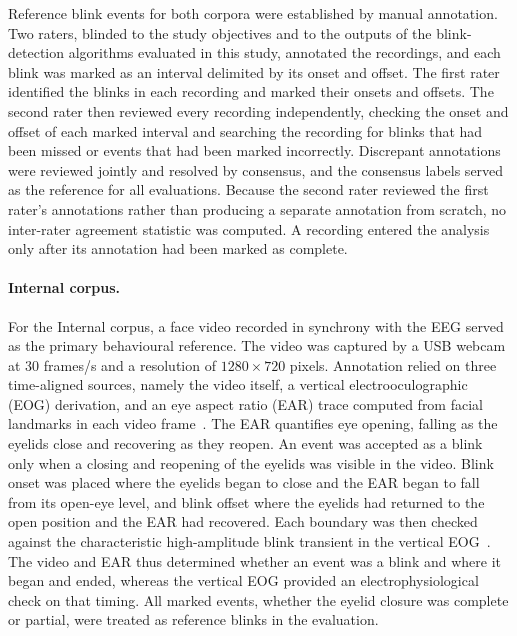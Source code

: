 \documentclass[journal,twoside,web]{ieeecolor}
\begin{document}
Reference blink events for both corpora were established by manual annotation. Two raters, blinded to the study objectives and to the outputs of the blink-detection algorithms evaluated in this study, annotated the recordings, and each blink was marked as an interval delimited by its onset and offset. The first rater identified the blinks in each recording and marked their onsets and offsets. The second rater then reviewed every recording independently, checking the onset and offset of each marked interval and searching the recording for blinks that had been missed or events that had been marked incorrectly. Discrepant annotations were reviewed jointly and resolved by consensus, and the consensus labels served as the reference for all evaluations. Because the second rater reviewed the first rater's annotations rather than producing a separate annotation from scratch, no inter-rater agreement statistic was computed. A recording entered the analysis only after its annotation had been marked as complete.

\paragraph{Internal corpus.}
For the Internal corpus, a face video recorded in synchrony with the EEG served as the primary behavioural reference. The video was captured by a USB webcam at 30 frames/s and a resolution of $1280\times720$ pixels.
%
Annotation relied on three time-aligned sources, namely the video itself, a vertical electrooculographic (EOG) derivation, and an eye aspect ratio (EAR) trace computed from facial landmarks in each video frame~\citep{soukupova2016realtime}. The EAR quantifies eye opening, falling as the eyelids close and recovering as they reopen. An event was accepted as a blink only when a closing and reopening of the eyelids was visible in the video. Blink onset was placed where the eyelids began to close and the EAR began to fall from its open-eye level, and blink offset where the eyelids had returned to the open position and the EAR had recovered. Each boundary was then checked against the characteristic high-amplitude blink transient in the vertical EOG~\citep{croft2000removal}. The video and EAR thus determined whether an event was a blink and where it began and ended, whereas the vertical EOG provided an electrophysiological check on that timing. All marked events, whether the eyelid closure was complete or partial, were treated as reference blinks in the evaluation.
\end{document}
